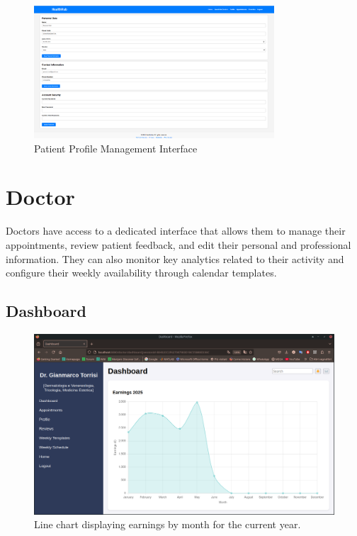 \begin{figure}[H]
	\centering
	\includegraphics[width=0.8\textwidth]{resources/screenshots/patient_ui/patient-profile.png}
	\caption{Patient Profile Management Interface}
	\label{fig:patient-profile}
\end{figure}


\section{Doctor}

Doctors have access to a dedicated interface that allows them to manage their appointments, review patient feedback, and edit their personal and professional information. They can also monitor key analytics related to their activity and configure their weekly availability through calendar templates.

\subsection{Dashboard}

\begin{figure}[!h]
	\centering
	\includegraphics[scale=0.30]{resources/screenshots/doctor_ui/earnings_linechart.png}
	\caption{Line chart displaying earnings by month for the current year.}
	\label{fig:earnings_linechart}
\end{figure}

